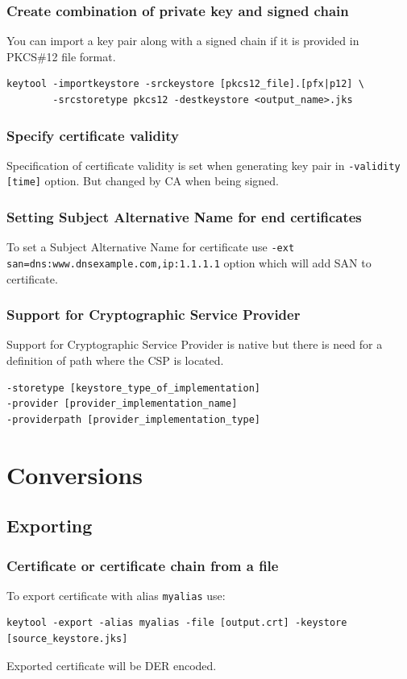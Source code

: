 \documentclass[10pt, a4paper]{report}
\begin{document}
    \subsubsection{Create combination of private key and signed chain}
You can import a key pair along with a signed chain if it is provided in PKCS\#12 file format.
\begin{verbatim}
keytool -importkeystore -srckeystore [pkcs12_file].[pfx|p12] \
        -srcstoretype pkcs12 -destkeystore <output_name>.jks
\end{verbatim}

    \subsubsection{Specify certificate validity}
Specification of certificate validity is set when generating key pair in \verb+-validity [time]+ option. But changed by CA when being signed.

    \subsubsection{Setting Subject Alternative Name for end certificates}
To set a Subject Alternative Name for certificate use \verb+-ext san=dns:www.dnsexample.com,ip:1.1.1.1+ option which will add SAN to certificate.

    \subsubsection{Support for Cryptographic Service Provider}
Support for Cryptographic Service Provider is native but there is need for a definition of path where the CSP is located.
\begin{verbatim}
-storetype [keystore_type_of_implementation]
-provider [provider_implementation_name]
-providerpath [provider_implementation_type]
\end{verbatim}

    
\section{Conversions}

  \subsection{Exporting}
  
    \subsubsection{Certificate or certificate chain from a file}
To export certificate with alias \verb+myalias+ use:
\begin{verbatim}
keytool -export -alias myalias -file [output.crt] -keystore [source_keystore.jks]
\end{verbatim}  
Exported certificate will be DER encoded.
\end{document}
